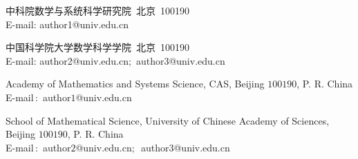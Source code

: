 \documentclass{amsc}          %
\numberwithin{equation}{section} %
\begin{document}




\BeginTitle


 {中科院数学与系统科学研究院\  北京\ 100190\\ %
E-mail: author1@univ.edu.cn}

{中国科学院大学数学科学学院\  北京\ 100190\\
E-mail: author2@univ.edu.cn;\ author3@univ.edu.cn}







{Academy of Mathematics and Systems Science, CAS, Beijing $100190$, P. R. China \\            %
E-mail\,$:$ author$1$@univ.edu.cn}

{School of Mathematical Science, University of Chinese Academy of Sciences,\\ Beijing $100190$, P. R. China  \\
E-mail\,$:$ author$2$@univ.edu.cn$;$\ author$3$@univ.edu.cn}


\end{document}
